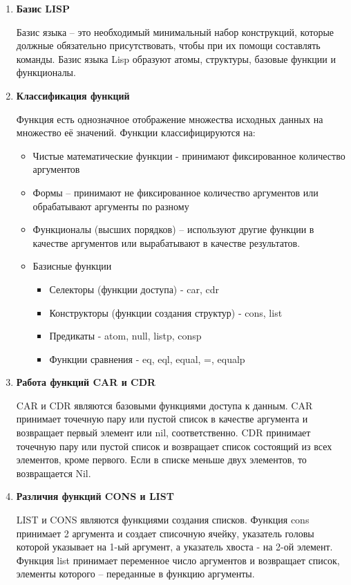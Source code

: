 \begin{enumerate}

\item \textbf{Базис LISP}

Базис языка – это необходимый минимальный набор конструкций, которые должные обязательно присутствовать, чтобы при их помощи составлять команды. Базис языка Lisp образуют атомы, структуры, базовые функции и функционалы. 

\item \textbf{Классификация функций}

Функция есть однозначное отображение множества исходных данных на множество её значений.
Функции классифицируются на:
\begin{itemize}
\item Чистые математические функции - принимают фиксированное количество аргументов
\item Формы – принимают не фиксированное количество аргументов или обрабатывают аргументы по разному
\item Функционалы (высших порядков) – используют другие функции в качестве аргументов или вырабатывают в качестве результатов.
\item Базисные функции
\begin{itemize}
\item Селекторы (функции доступа) - car, cdr
\item Конструкторы (функции создания структур) - cons, list
\item Предикаты - atom, null, listp, consp
\item Функции сравнения - eq, eql, equal, =, equalp
\end{itemize}
\end{itemize}

\item \textbf{Работа функций CAR и CDR}

CAR и CDR являются базовыми функциями доступа к данным. CAR принимает точечную пару или пустой список в качестве аргумента и возвращает первый элемент или nil, соответственно. CDR принимает точечную пару или пустой список и возвращает список состоящий из всех элементов, кроме первого. Если в списке меньше двух элементов, то возвращается Nil.

\item \textbf{Различия функций CONS и LIST}

LIST и CONS являются функциями создания списков.
Функция cons принимает 2 аргумента и создает списочную ячейку, указатель головы которой указывает на 1-ый аргумент, а указатель хвоста - на 2-ой элемент. Функция list принимает переменное число аргументов и возвращает список, элементы которого – переданные в функцию аргументы.\\

\end{enumerate}

